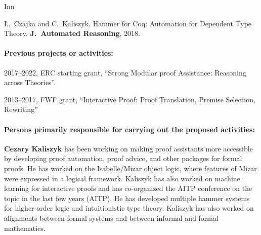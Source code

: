\begin{sitedescription}{Inn}
\begin{compactitem}
\item
Ł.~Czajka and C.~Kaliszyk.
\newblock Hammer for Coq: Automation for Dependent Type Theory.
\textbf{J.~Automated Reasoning}, 2018.
\end{compactitem}

\paragraph*{Previous projects or activities:}

\begin{compactitem}
\item 2017--2022, ERC starting grant, ``Strong Modular proof Assistance: Reasoning across Theories''.
\item 2013--2017, FWF grant, ``Interactive Proof: Proof Translation, Premise Selection, Rewriting''
\end{compactitem}




\paragraph*{Persons primarily responsible for carrying out the proposed activities:}

\begin{compactitem}
\item \textbf{Cezary Kaliszyk} has been working on making proof assistants
more accessible by developing proof automation, proof advice, and other packages for formal
proofs. He has worked on the Isabelle/Mizar object logic, where features of Mizar were
expressed in a logical framework. Kaliszyk has also worked on machine learning for interactive
proofs and has co-organized the AITP conference on the topic in the last few years (AITP). He
has developed multiple hammer systems for higher-order logic and intuitionistic type theory.
Kaliszyk has also worked on alignments between formal systems and between informal and formal
mathematics.
\end{compactitem}



\end{sitedescription}

